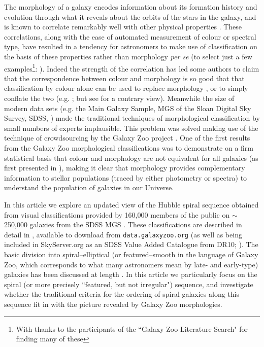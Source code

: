\documentclass[usenatbib]{mn2e}
\begin{document}
The morphology of a galaxy encodes information about its formation history and evolution through what it reveals about the orbits of the stars in the galaxy, and is known to correlate remarkably well with other physical properties \citep[e.g. star formation rate, gas content, stellar mass][]{RobertsHaynes1994, Kennicutt1998, Strateva2001}. These correlations, along with the ease of automated measurement of colour or spectral type, have resulted in a tendency for astronomers to make use of classification on the basis of these properties rather than morphology {\it per se} (to select just a few examples\footnote{With thanks to the participants of the ``Galaxy Zoo Literature Search" for finding many of these}: \citealt{Bell2004, Weinmann2006, vandenBosch2008, Cooper2010, Zehavi2011}). Indeed the strength of the correlation has led some authors to claim that the correspondence between colour and morphology is so good that that classification by colour alone can be used to replace morphology \citep[e.g.][]{ParkChoi2005, Faber2007, AscasibarAlmeida2011}, or to simply conflate the two (e.g. \citealt{TalvanDokkum2011}; but see \citealt{vandenBergh2007} for a contrary view). Meanwhile the size of modern data sets (e.g. the Main Galaxy Sample, MGS of the Sloan Digital Sky Survey, SDSS, \citealt{Strauss2002}) made the traditional techniques of morphological classification by small numbers of experts implausible. This problem was solved making use of the technique of crowdsourcing by the Galaxy Zoo project \citep{Lintott2008,Lintott2011}. One of the first results from the Galaxy Zoo morphological classifications was to demonstrate on a firm statistical basis that colour and morphology are not equivalent for all galaxies (as first presented in \citealt{Bamford2009, Schawinski2009,Masters2010}), making it clear that morphology provides complementary information to stellar populations (traced by either photometry or spectra) to understand the population of galaxies in our Universe.   

 In this article we explore an updated view of the Hubble spiral sequence obtained from visual classifications provided by 160,000 members of the public on $\sim$ 250,000 galaxies from the SDSS MGS \citep{Strauss2002}. These classifications are described in detail in \citet{Willett2013}, available to download from {\tt data.galaxyzoo.org} (as well as being included in SkyServer.org as an SDSS Value Added Catalogue from DR10; \citealt{DR10}). The basic division into spiral--elliptical (or featured--smooth in the language of Galaxy Zoo, which corresponds to what many astronomers mean by late- and early-type) galaxies has been discussed at length \citep[e.g.][]{Willett2013}. In this article we particularly focus on the spiral (or more precisely ``featured, but not irregular") sequence, and investigate whether the traditional criteria for the ordering of spiral galaxies along this sequence fit in with the picture revealed by Galaxy Zoo morphologies. 
\end{document}

